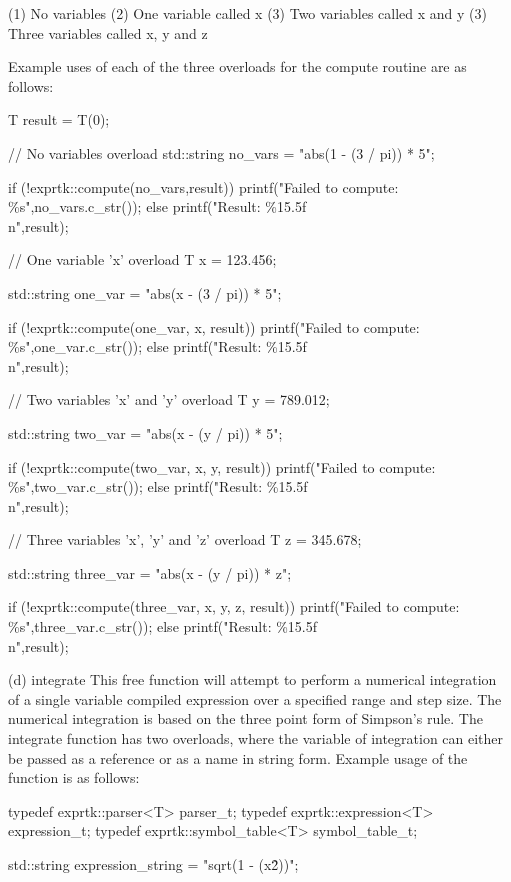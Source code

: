 {(1) No variables
(2) One variable called x
(3) Two variables called x and y
(3) Three variables called x, y and z


Example uses of  each of the  three overloads for  the compute routine
are as follows:

T result = T(0);

// No variables overload
std::string no\_vars = "abs(1 - (3 / pi)) * 5";

if (!exprtk::compute(no\_vars,result))
printf("Failed to compute: \%s",no\_vars.c\_str());
else
printf("Result: \%15.5f\\n",result);

// One variable 'x' overload
T x = 123.456;

std::string one\_var = "abs(x - (3 / pi)) * 5";

if (!exprtk::compute(one\_var, x, result))
printf("Failed to compute: \%s",one\_var.c\_str());
else
printf("Result: \%15.5f\\n",result);

// Two variables 'x' and 'y' overload
T y = 789.012;

std::string two\_var = "abs(x - (y / pi)) * 5";

if (!exprtk::compute(two\_var, x, y, result))
printf("Failed to compute: \%s",two\_var.c\_str());
else
printf("Result: \%15.5f\\n",result);

// Three variables 'x', 'y' and 'z' overload
T z = 345.678;

std::string three\_var = "abs(x - (y / pi)) * z";

if (!exprtk::compute(three\_var, x, y, z, result))
printf("Failed to compute: \%s",three\_var.c\_str());
else
printf("Result: \%15.5f\\n",result);


(d) integrate
This free function will attempt to perform a numerical integration  of
a single variable compiled expression over a specified range and  step
size. The numerical  integration is based  on the three  point form of
Simpson's rule. The  integrate function has  two overloads, where  the
variable of integration can  either be passed as  a reference or as  a
name in string form. Example usage of the function is as follows:

typedef exprtk::parser<T>             parser\_t;
typedef exprtk::expression<T>     expression\_t;
typedef exprtk::symbol\_table<T> symbol\_table\_t;

std::string expression\_string = "sqrt(1 - (x\^2))";

}
